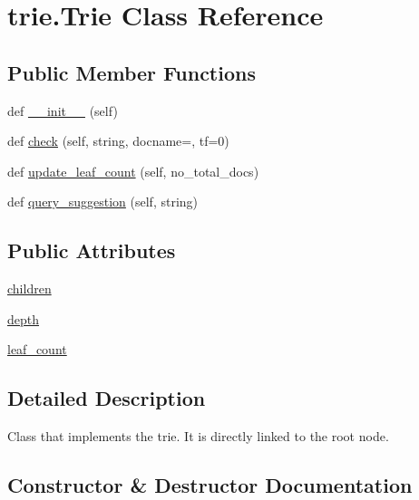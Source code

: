 \hypertarget{classtrie_1_1_trie}{}\section{trie.\+Trie Class Reference}
\label{classtrie_1_1_trie}
\subsection*{Public Member Functions}
\begin{DoxyCompactItemize}
\item 
def \hyperlink{classtrie_1_1_trie_a36d10ddf184aa8944b366278e3652a2f}{\+\_\+\+\_\+init\+\_\+\+\_\+} (self)
\item 
def \hyperlink{classtrie_1_1_trie_a270bb01a8e9b3ab3459758746dc4e434}{check} (self, string, docname=\textquotesingle{}\textquotesingle{}, tf=0)
\item 
def \hyperlink{classtrie_1_1_trie_ad9c6106b14049f789df88d70d4cf36c1}{update\+\_\+leaf\+\_\+count} (self, no\+\_\+total\+\_\+docs)
\item 
def \hyperlink{classtrie_1_1_trie_a66c2c3035ba7e37a9f9ada5f3c55591d}{query\+\_\+suggestion} (self, string)
\end{DoxyCompactItemize}
\subsection*{Public Attributes}
\begin{DoxyCompactItemize}
\item 
\hyperlink{classtrie_1_1_trie_a1ad4feb4d215545f082dfdb48e28e25c}{children}
\item 
\hyperlink{classtrie_1_1_trie_ae7936c113992d223e60620e6a5bf15e7}{depth}
\item 
\hyperlink{classtrie_1_1_trie_ad2560d8eda3b7d63a0b379f26618279d}{leaf\+\_\+count}
\end{DoxyCompactItemize}


\subsection{Detailed Description}
\begin{DoxyVerb}Class that implements the trie. It is directly linked to the root node.\end{DoxyVerb}
 

\subsection{Constructor \& Destructor Documentation}
